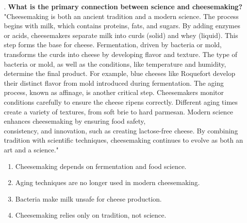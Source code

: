 \documentclass[12pt]{article}
\begin{document}
\vspace{1cm}
. \textbf{What is the primary connection between science and cheesemaking?\\}
"Cheesemaking is both an ancient tradition and a modern science. The process begins with milk, which contains proteins, fats, and sugars. By adding enzymes or acids, cheesemakers separate milk into curds (solid) and whey (liquid). This step forms the base for cheese. Fermentation, driven by bacteria or mold, transforms the curds into cheese by developing flavor and texture. The type of bacteria or mold, as well as the conditions, like temperature and humidity, determine the final product. For example, blue cheeses like Roquefort develop their distinct flavor from mold introduced during fermentation. The aging process, known as affinage, is another critical step. Cheesemakers monitor conditions carefully to ensure the cheese ripens correctly. Different aging times create a variety of textures, from soft brie to hard parmesan. Modern science enhances cheesemaking by ensuring food safety,\\ consistency, and innovation, such as creating lactose-free cheese. By combining tradition with scientific techniques, cheesemaking continues to evolve as both an art and a science."\\
\begin{enumerate}[label=\Alph*.]
    \item Cheesemaking depends on fermentation and food science.  
    \item Aging techniques are no longer used in modern cheesemaking.  
    \item Bacteria make milk unsafe for cheese production.  
    \item Cheesemaking relies only on tradition, not science.  
\end{enumerate}
\end{document}
